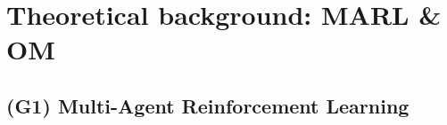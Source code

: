 

\section{Theoretical background: MARL \& OM}



\subsection{(G1) Multi-Agent Reinforcement Learning}

